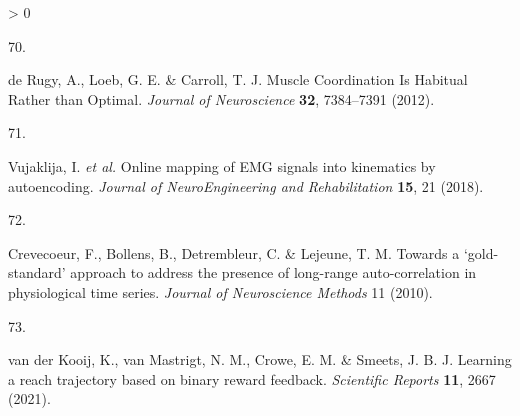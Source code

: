 \documentclass[
  a4paper,
]{article}
\newlength{\cslhangindent}
\newlength{\csllabelwidth}
\newenvironment{CSLReferences}[2] %
 {%
  \setlength{\parindent}{0pt}
  \ifodd #1 \everypar{\setlength{\hangindent}{\cslhangindent}}\ignorespaces\fi
  \ifnum #2 > 0
  \setlength{\parskip}{#2\baselineskip}
  \fi
 }%
 {}
\newcommand{\CSLLeftMargin}[1]{\parbox[t]{\csllabelwidth}{#1}}
\newcommand{\CSLRightInline}[1]{\parbox[t]{\linewidth - \csllabelwidth}{#1}\break}
\begin{document}
\begin{CSLReferences}{0}{0}
\leavevmode\hypertarget{ref-derugyMuscleCoordinationHabitual2012}{}%
\CSLLeftMargin{70. }
\CSLRightInline{de Rugy, A., Loeb, G. E. \& Carroll, T. J. Muscle
{Coordination Is Habitual Rather} than {Optimal}. \emph{Journal of
Neuroscience} \textbf{32}, 7384--7391 (2012).}

\leavevmode\hypertarget{ref-vujaklijaOnlineMappingEMG2018}{}%
\CSLLeftMargin{71. }
\CSLRightInline{Vujaklija, I. \emph{et al.} Online mapping of {EMG}
signals into kinematics by autoencoding. \emph{Journal of
NeuroEngineering and Rehabilitation} \textbf{15}, 21 (2018).}

\leavevmode\hypertarget{ref-crevecoeurGoldstandardApproachAddress2010}{}%
\CSLLeftMargin{72. }
\CSLRightInline{Crevecoeur, F., Bollens, B., Detrembleur, C. \& Lejeune,
T. M. Towards a {`gold-standard'} approach to address the presence of
long-range auto-correlation in physiological time series. \emph{Journal
of Neuroscience Methods} 11 (2010).}

\leavevmode\hypertarget{ref-vanderkooijLearningReachTrajectory2021}{}%
\CSLLeftMargin{73. }
\CSLRightInline{van der Kooij, K., van Mastrigt, N. M., Crowe, E. M. \&
Smeets, J. B. J. Learning a reach trajectory based on binary reward
feedback. \emph{Scientific Reports} \textbf{11}, 2667 (2021).}

\end{CSLReferences}
\end{document}
